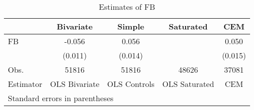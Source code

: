 \begin{table}[htbp]\centering
\caption{Estimates of FB}
\begin{tabular}{l*{4}{c}}
\hline\hline
                    &   Bivariate&      Simple&   Saturated&         CEM\\
\hline
\hline
FB                  &      -0.056&       0.056&            &       0.050\\
                    &     (0.011)&     (0.014)&            &     (0.015)\\
Obs.                &       51816&       51816&       48626&       37081\\
Estimator           &OLS Bivariate&OLS Controls&OLS Saturated&         CEM\\
\hline\hline
\multicolumn{5}{l}{\footnotesize Standard errors in parentheses}\\
\end{tabular}
\end{table}
